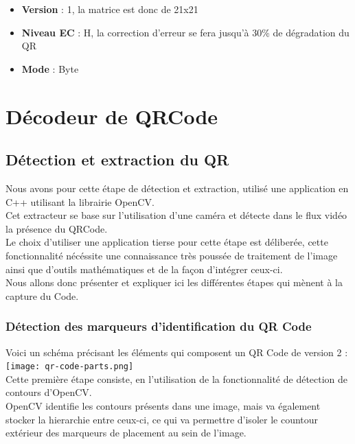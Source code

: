 \documentclass{report}
\begin{document}
		\begin{itemize}
			\item \textbf{Version} : 1, la matrice est donc de 21x21
			\item \textbf{Niveau EC} : H, la correction d'erreur se fera jusqu'à 30\% de dégradation du QR
			\item \textbf{Mode} : Byte
		\end{itemize}

\chapter{Décodeur de QRCode}

	\section{Détection et extraction du QR}

		Nous avons pour cette étape de détection et extraction, utilisé une application en C++ utilisant la librairie OpenCV.\\
		Cet extracteur se base sur l'utilisation d'une caméra et détecte dans le flux vidéo la présence du QRCode.\\

		Le choix d'utiliser une application tierse pour cette étape est déliberée, cette fonctionnalité nécéssite une connaissance très poussée de traitement de l'image ainsi que d'outils mathématiques et de la façon d'intégrer ceux-ci.\\

		Nous allons donc présenter et expliquer ici les différentes étapes qui mènent à la capture du Code.\\

		\subsection{Détection des marqueurs d'identification du QR Code}

			Voici un schéma précisant les éléments qui composent un QR Code de version 2 : \\

			\texttt{[image: qr-code-parts.png]}\\

			Cette première étape consiste, en l'utilisation de la fonctionnalité de détection de contours d'OpenCV.\\
			OpenCV identifie les contours présents dans une image, mais va également stocker la hierarchie entre ceux-ci, ce qui va permettre d'isoler le countour extérieur des marqueurs de placement au sein de l'image.\\
\end{document}
